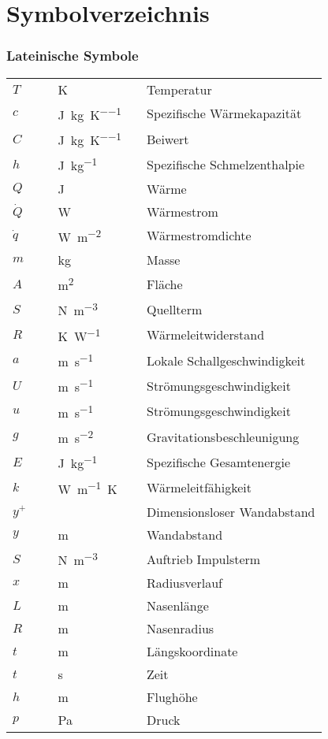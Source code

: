 \chapter*{Symbolverzeichnis}
	
\subsection*{Lateinische Symbole}

\begin{supertabular}{p{10mm}p{3mm}p{20mm}p{3mm}l}
$T$ && \SI{}{\kelvin} && Temperatur\\
$c$ && \SI{}{\joule\per\kilogram\per\kelvin} && Spezifische Wärmekapazität\\
$C$ && \SI{}{\joule\per\kilogram\per\kelvin} && Beiwert\\
$h$ && \SI{}{\joule\per\kilogram} && Spezifische Schmelzenthalpie\\
$Q$ && \SI{}{\joule} && Wärme\\
$\dot{Q}$ && \SI{}{\watt} && Wärmestrom\\
$\dot{q}$ && \SI{}{\watt\per\meter\squared} && Wärmestromdichte\\ 
$m$ && \SI{}{\kilo\gram} && Masse\\
$A$ && \SI{}{\meter\squared} && Fläche\\
$S$ && \SI{}{\newton\per\meter\cubed} && Quellterm\\
$R$ && \SI{}{\kelvin\per\watt} && Wärmeleitwiderstand\\
$a$ && \SI{}{\meter\per\second} && Lokale Schallgeschwindigkeit\\
$U$ && \SI{}{\meter\per\second} && Strömungsgeschwindigkeit\\
$u$ && \SI{}{\meter\per\second} && Strömungsgeschwindigkeit\\
$g$ && \SI{}{\meter\per\second\squared} && Gravitationsbeschleunigung\\
$E$ && \SI{}{\joule\per\kilogram} && Spezifische Gesamtenergie\\
$k$ && \SI{}{\watt\per\meter\kelvin} && Wärmeleitfähigkeit\\
$y^+$ && && Dimensionsloser Wandabstand\\
$y$ && \SI{}{\meter} && Wandabstand\\
$S$ && \SI{}{\newton\per\meter\cubed} && Auftrieb Impulsterm\\
$x$ && \SI{}{\meter} && Radiusverlauf\\
$L$ && \SI{}{\meter} && Nasenlänge\\
$R$ && \SI{}{\meter} && Nasenradius\\
$t$ && \SI{}{\meter} && Längskoordinate\\
$t$ && \SI{}{\second} && Zeit\\
$h$ && \SI{}{\meter} && Flughöhe\\
$p$ && \SI{}{\pascal} && Druck\\
\end{supertabular}



